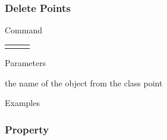 \documentclass[9pt]{beamer}
\begin{document}
\begin{frame}[t] \frametitle{Delete Points}

	\begin{block}{Command} 
		\begin{tabularx}{\textwidth}{@{}l@{}l@{}R}
			 &
				 & \InstrItem
		\end{tabularx}
	\end{block}

	\begin{block}{Parameters} \begin{itemize}
		   the name of the object from the class point
	\end{itemize} \end{block}

	\begin{block}{Examples}
	\end{block}

\end{frame}

\subsubsection{Property}
\end{document}
